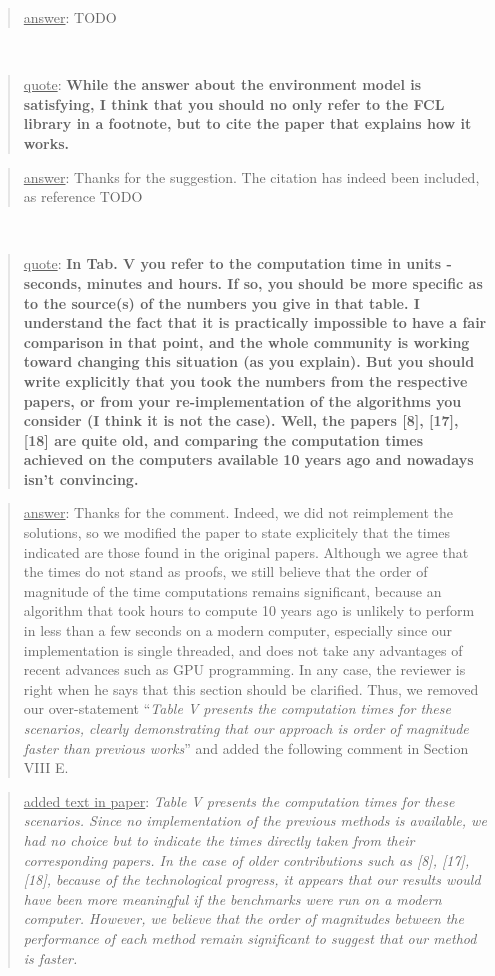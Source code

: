 \documentclass[a4paper]{article}
\newcommand\quot[1]{\begin{quote} \underline{quote}: \textbf{#1}\end{quote}}
\newcommand\as[1]{\begin{quote} \underline{answer}: {#1}\end{quote} }
\newcommand\qt[1]{\begin{quote} \underline{added text in paper}: \textit{#1}\end{quote} \leavevmode \\ }
\begin{document}
\as{TODO}
\leavevmode \\

\quot{
While the answer about the environment model is satisfying, I think
that you should no only refer to the FCL library in a footnote, but to
cite the paper that explains how it works.
}
\as{Thanks for the suggestion. The citation has indeed been included, as reference TODO}
\leavevmode \\

\quot{
In Tab. V you refer to the computation time in units - seconds,
minutes and hours. If so, you should be more specific as to the
source(s) of the numbers you give in that table. I understand the fact
that it is practically impossible to have a fair comparison in that
point, and the whole community is working toward changing this
situation (as you explain). But you should write explicitly that you
took the numbers from the respective papers, or from your
re-implementation of the algorithms you consider (I think it is not the
case). Well, the papers [8], [17], [18] are quite old, and comparing
the computation times achieved on the computers available 10 years ago
and nowadays isn't convincing. 
}
\as{Thanks for the comment. Indeed, we did not reimplement the solutions, so we modified the paper to state explicitely that the times indicated are those found in the original papers. Although we agree that the times do not stand as proofs, we still believe that the order of magnitude of the time computations remains significant, because an algorithm that took hours to compute 10 years ago is unlikely to perform in less than a few seconds on a modern computer, especially since our implementation is single threaded, and does not take any advantages of recent advances such as GPU programming. In any case, the reviewer is right when he says that this section should be clarified.
Thus, we removed our over-statement ``\textit{Table V presents the computation times for these scenarios, clearly demonstrating that our approach is order of magnitude faster than previous works}'' and added the following comment in Section VIII E.}
\qt{
Table V presents the computation times for these scenarios. Since no implementation of the previous methods is available, we had no choice but to indicate the times directly taken from their corresponding papers.
In the case of older contributions such as [8], [17], [18], because of the technological progress, it appears that our results would have been more meaningful if the benchmarks were run on a modern computer. However, we believe that the order of magnitudes between the performance of each method remain significant to suggest that our method is faster.
}
\leavevmode \\
\end{document}
